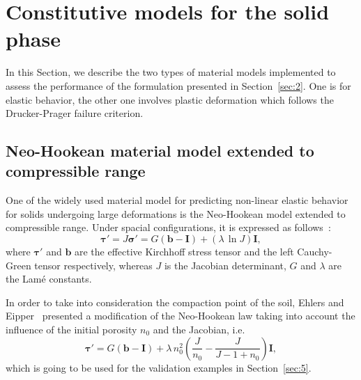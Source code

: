 \documentclass[twocolumn]{svjour3}          %
\begin{document}
{\color{red}
\section{Constitutive models for the solid phase} \label{sec:3}
In this Section, we describe the two types of material models implemented to assess the performance of the   formulation presented in Section~\ref{sec:2}. One is for  elastic behavior, the other one involves  plastic deformation which follows the Drucker-Prager failure criterion.  
\subsection{Neo-Hookean material model extended to compressible range} \label{subsec:31}
One of the widely used material model for predicting non-linear elastic behavior for solids undergoing large deformations   is the Neo-Hookean model extended to compressible range. Under spacial configurations,   it is expressed as follows~\cite{Bonet:97}:
\begin{equation}\label{eq_nh1}
\boldsymbol{\tau}'=J\boldsymbol{\sigma}'=G(\boldsymbol{b}-\textbf{I})+(\lambda \,\ln J)\textbf{I},
\end{equation}
where $\boldsymbol{\tau}'$ and  $\boldsymbol{b}$ are the effective Kirchhoff stress tensor and the left Cauchy-Green tensor respectively, whereas $J$ is the   Jacobian determinant, $G$ and $\lambda$ are the Lam\'e constants.  

In order to take into consideration the compaction point of the soil, Ehlers and Eipper~\cite{Ehlers:99} presented a modification of the Neo-Hookean law taking into account the influence of  the initial porosity  $n_0$ and the Jacobian, i.e.
\begin{equation}\label{eq_nh2}
\boldsymbol{\tau}'=G(\boldsymbol{b}-\textbf{I})+\lambda \, n_0^2\left(  \frac{J}{n_0}-\frac{J}{J-1+n_0} \right)\textbf{I},
\end{equation}
which is going to be used for the validation examples in Section~\ref{sec:5}.
}
\end{document}
